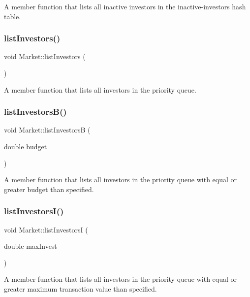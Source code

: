 A member function that lists all inactive investors in the inactive-\/investors hash table. \mbox{\label{class_market_a74b4c64f3588d9198ba18d45ae55d5ca}} 
\subsubsection{\texorpdfstring{list\+Investors()}{listInvestors()}}
{\footnotesize\ttfamily void Market\+::list\+Investors (\begin{DoxyParamCaption}{ }\end{DoxyParamCaption})}

A member function that lists all investors in the priority queue. \mbox{\label{class_market_a395055730dcedd57aa6ecbb7b776e91e}} 
\subsubsection{\texorpdfstring{list\+Investors\+B()}{listInvestorsB()}}
{\footnotesize\ttfamily void Market\+::list\+InvestorsB (\begin{DoxyParamCaption}\item[{double}]{budget }\end{DoxyParamCaption})}

A member function that lists all investors in the priority queue with equal or greater budget than specified. \mbox{\label{class_market_a8bc534842a089444397c987a3dec1c56}} 
\subsubsection{\texorpdfstring{list\+Investors\+I()}{listInvestorsI()}}
{\footnotesize\ttfamily void Market\+::list\+InvestorsI (\begin{DoxyParamCaption}\item[{double}]{max\+Invest }\end{DoxyParamCaption})}

A member function that lists all investors in the priority queue with equal or greater maximum transaction value than specified. \mbox{\label{class_market_aef2b499d00dd8428c4c8070bf599956d}} 
